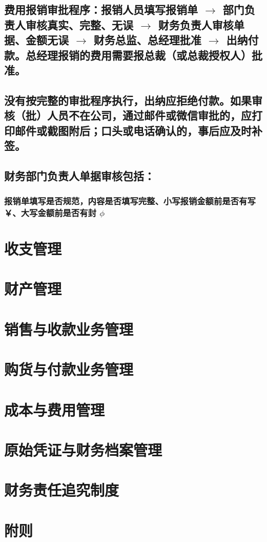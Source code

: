 \documentclass{ctexart}
\begin{document}
\subsection{费用报销审批程序：报销人员填写报销单 $\to$ 部门负责人审核真实、完整、无误 $\to$ 财务负责人审核单据、金额无误 $\to$ 财务总监、总经理批准 $\to$ 出纳付款。总经理报销的费用需要报总裁（或总裁授权人）批准。}
\label{sec-2-4}
\subsection{没有按完整的审批程序执行，出纳应拒绝付款。如果审核（批）人员不在公司，通过邮件或微信审批的，应打印邮件或截图附后；口头或电话确认的，事后应及时补签。}
\label{sec-2-5}
\subsection{财务部门负责人单据审核包括：}
\label{sec-2-6}
\subsubsection{报销单填写是否规范，内容是否填写完整、小写报销金额前是否有写￥、大写金额前是否有封 $\phi$}
\label{sec-2-6-1}
\section{收支管理}
\label{sec-3}

\section{财产管理}
\label{sec-4}

\section{销售与收款业务管理}
\label{sec-5}

\section{购货与付款业务管理}
\label{sec-6}

\section{成本与费用管理}
\label{sec-7}

\section{原始凭证与财务档案管理}
\label{sec-8}

\section{财务责任追究制度}
\label{sec-9}

\section{附则}
\label{sec-10}
\end{document}
